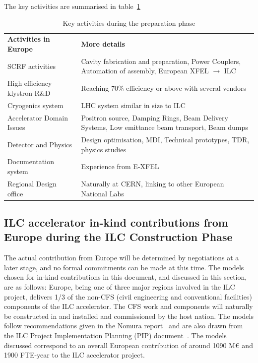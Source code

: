 \documentclass[%
 reprint,
 floatfix,
 amsmath,amssymb,
 aps,
]{revtex4-1}
\begin{document}
The key activities are summarised in table~\ref{fig:prep-phase-summary} 




\begin{table}[htbp]
\begin{ruledtabular}
\begin{tabular}{p{3.5cm}p{4.75cm}}
 \bfseries {Activities in Europe} &\bfseries{More details}                                                         \\
SCRF activities			&Cavity fabrication and preparation, Power Couplers, Automation of assembly, European XFEL $\rightarrow$ ILC\\
High efficiency klystron R\&D   &Reaching 70\% efficiency or above with several vendors   \\
Cryogenics system               &LHC system similar in size to ILC\\
Accelerator Domain Issues       &Positron source, Damping Rings, Beam Delivery Systems, Low emittance beam transport, Beam dumps\\
Detector and Physics            &Design optimisation, MDI, Technical prototypes, TDR, physics studies\\
Documentation system            &Experience from E-XFEL                                       \\
Regional Design office          &Naturally at CERN, linking to other European National Labs \\
\end{tabular}
\end{ruledtabular}
\caption{\label{fig:prep-phase-summary} Key activities during the preparation phase}
\end{table}


\subsection{ILC accelerator in-kind contributions from Europe during the ILC Construction Phase ~\label{sec:acc:constrphase}}

The actual contribution from Europe will be determined by negotiations at a 
later stage, and no formal commitments can be made at this time. The models 
chosen for in-kind contributions in this document, and discussed in this 
section, are as follows: Europe, being one of three major regions involved in 
the ILC project, delivers 1/3 of the non-CFS (civil engineering and conventional facilities) 
components of the ILC accelerator. The CFS work 
and components will naturally be constructed in and installed and 
commissioned by the host nation. The models follow recommendations given in 
the Nomura report~\cite{Nomura-eng} and are also drawn from the ILC Project Implementation 
Planning (PIP) document~\cite{ILCPIP}. The models discussed correspond to an overall 
European contribution of around 1090 M\euro{} and 1900 FTE-year to the ILC accelerator project. 
\end{document}
